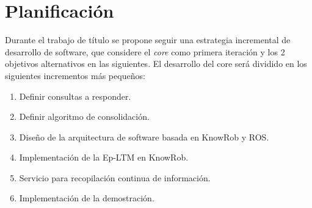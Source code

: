 



\section{Planificaci\'on}

Durante el trabajo de t\'itulo se propone seguir una estrategia incremental de desarrollo de software, que considere el \textit{core} como primera iteraci\'on y los 2 objetivos alternativos en las siguientes. El desarrollo del core ser\'a dividido en los siguientes incrementos m\'as peque\~nos:
\begin{enumerate}[topsep=0pt]
\setlength\itemsep{0.2em}
\item Definir consultas a responder.

\item Definir algoritmo de consolidaci\'on.

\item Dise\~no de la arquitectura de software basada en KnowRob y ROS.

\item Implementaci\'on de la Ep-LTM en KnowRob.

\item Servicio para recopilaci\'on continua de informaci\'on.

\item Implementaci\'on de la demostraci\'on.
\end{enumerate}


